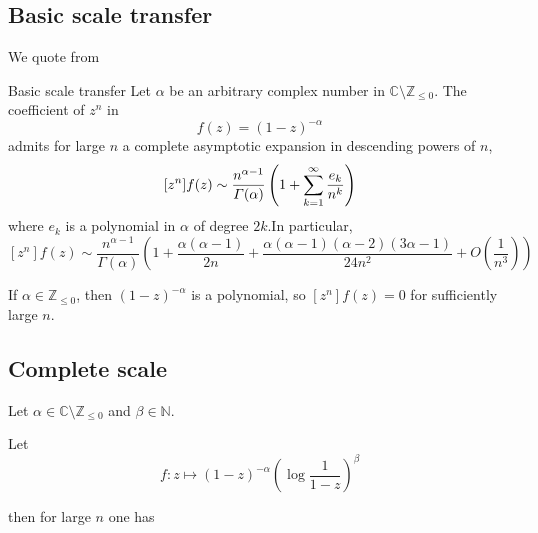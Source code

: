 \documentclass[../main.tex]{subfiles}
\begin{document}
\subsection{Basic scale transfer}

We quote from \cite{Flajolet2009}

\begin{thm}{Basic scale transfer}
	Let $\alpha$ be an arbitrary complex number in
	$\mathbb{C} \setminus \mathbb{Z}_{\leq 0}$.
	The coefficient of $z^n$ in
	\[
	f(z) = {(1 - z)}^{-\alpha}
	\]
	admits for large $n$ a complete asymptotic expansion in descending powers of $n$,
	\[
	[z^n]f(z) \sim \frac{n^{\alpha - 1}}{\Gamma(\alpha)}
	\left(1 + \sum\limits_{k = 1}^{\infty} \frac{e_k}{n^k} \right)
	\]
	where $e_k$ is a polynomial in $\alpha$ of degree $2k$.In particular,
	\[
	[z^n]f(z) \sim \frac{n^{\alpha - 1}}{\Gamma(\alpha)}
	\left(1 + \frac{\alpha (\alpha - 1)}{2n}
	+ \frac{\alpha (\alpha - 1)(\alpha - 2)(3\alpha - 1)}{24n^2} + O\left( \frac{1}{n^3} \right) \right)
	\]
\end{thm}


\begin{remark}
	If $\alpha \in \mathbb{Z}_{\leq 0}$, then ${(1 - z)}^{-\alpha}$ is a polynomial, so $[z^n]f(z) = 0$ for sufficiently large $n$.
\end{remark}

\subsection{Complete scale}

\begin{thm}{}
	Let $\alpha \in \mathbb{C} \setminus \mathbb{Z}_{\leq 0}$ and $\beta \in \mathbb{N}$.
	
	Let
	\[
	f : z \mapsto {(1 - z)}^{-\alpha} {\left( \log \frac{1}{1 - z} \right)}^\beta
	\]
	
	then for large $n$ one has
\end{thm}
\end{document}
